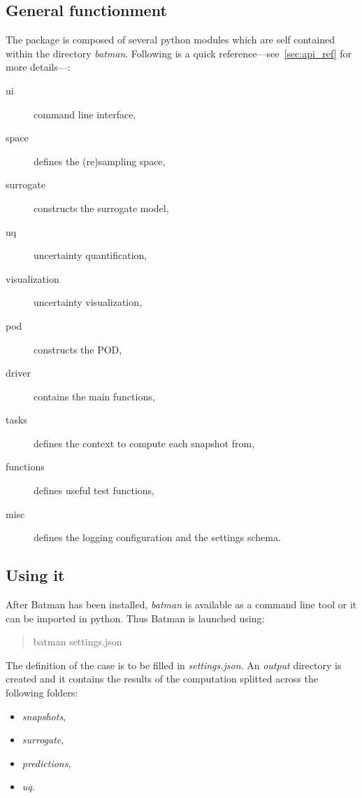 \subsection{General functionment}

The package is composed of several python modules which are self contained within the directory \emph{batman}. Following is a quick reference---see~\cref{sec:api_ref} for more details---:

\begin{description}
\item[ui] command line interface,
\item[space] defines the (re)sampling space,
\item[surrogate] constructs the surrogate model,
\item[uq] uncertainty quantification,
\item[visualization] uncertainty visualization,
\item[pod] constructs the POD,
\item[driver] contains the main functions,
\item[tasks] defines the context to compute each snapshot from,
\item[functions] defines useful test functions,
\item[misc] defines the logging configuration and the settings schema.
\end{description}

\subsection{Using it}

After Batman has been installed, \emph{batman} is available as a command line tool or it can be imported in python. Thus Batman is launched using:

\begin{quotation}
batman settings.json
\end{quotation}

The definition of the case is to be filled in \emph{settings.json}. An \emph{output} directory is created and it contains the results of the computation splitted across the following folders: 

\begin{itemize}
\item \emph{snapshots},
\item \emph{surrogate},
\item \emph{predictions},
\item \emph{uq}.
\end{itemize}

